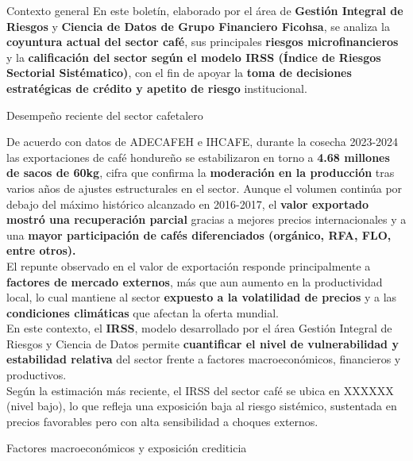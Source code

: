 \documentclass[final]{beamer}
\newlength{\colwidth}
\begin{document}
\begin{frame}[t]
\begin{columns}[t]
\begin{column}{\colwidth}
\begin{block}{Contexto general}
En este boletín, elaborado por el área de \textbf{Gestión Integral de Riesgos} y \textbf{Ciencia de Datos de Grupo Financiero Ficohsa}, se analiza la \textbf{coyuntura actual del sector café}, sus principales \textbf{riesgos microfinancieros} y la \textbf{calificación del sector según el modelo IRSS (Índice de Riesgos Sectorial Sistématico)}, con el fin de apoyar la \textbf{toma de decisiones estratégicas de crédito y apetito de riesgo} institucional.

  \end{block}
  \begin{block}{Desempeño reciente del sector cafetalero}

De acuerdo con datos de ADECAFEH e IHCAFE, durante la cosecha 2023-2024 las exportaciones de café hondureño se estabilizaron en torno a \textbf{4.68 millones de sacos de 60kg}, cifra que confirma la \textbf{moderación en la producción} tras varios años de ajustes estructurales en el sector. Aunque el volumen continúa por debajo del máximo histórico alcanzado en 2016-2017, el \textbf{valor exportado mostró una recuperación parcial} gracias a mejores precios internacionales y a una \textbf{mayor participación de cafés diferenciados (orgánico, RFA, FLO, entre otros).}\\[1cm]

El repunte observado en el valor de exportación responde principalmente a \textbf{factores de mercado externos}, más que aun aumento en la productividad local, lo cual mantiene al sector \textbf{expuesto a la volatilidad de precios} y a las \textbf{condiciones climáticas} que afectan la oferta mundial. \\[1cm]

En este contexto, el \textbf{IRSS}, modelo desarrollado por el área Gestión Integral de Riesgos y Ciencia de Datos permite \textbf{cuantificar el nivel de vulnerabilidad y estabilidad relativa} del sector frente a factores macroeconómicos, financieros y productivos. \\[1cm]

Según la estimación más reciente, el IRSS del sector café se ubica en XXXXXX (nivel bajo), lo que refleja una exposición baja al riesgo sistémico, sustentada en precios favorables pero con alta sensibilidad a choques externos.

   

  \end{block}
  \begin{block}{Factores macroeconómicos y exposición crediticia}


\end{block}
\end{column}
\end{columns}
\end{frame}
\end{document}
